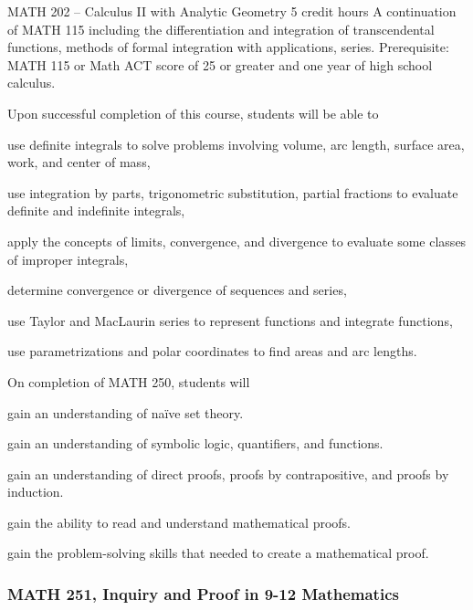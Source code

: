MATH 202 – Calculus II with Analytic Geometry 5 credit hours
A continuation of MATH 115 including the differentiation and integration of transcendental functions, methods of formal integration with applications, series.
Prerequisite: MATH 115 or Math ACT score of 25 or greater and one year of high school calculus.


 Upon successful completion of this course, students will be able to 
 \begin{alphalist}
    \item use definite integrals to solve problems involving volume, arc length, surface area, work, and center of mass, 
    \item use integration by parts, trigonometric substitution, partial fractions to evaluate definite and indefinite integrals,
    \item apply the concepts of limits, convergence, and divergence to evaluate some classes of improper integrals,
    \item determine convergence or divergence of sequences and series,
    \item use Taylor and MacLaurin series to represent functions and integrate functions,
    \item use parametrizations and polar coordinates to find areas and arc lengths.
 \end{alphalist}



On completion of MATH 250, students will 
\begin{alphalist}
    \item gain an understanding of naïve set theory. 
    \item gain an understanding of symbolic logic, quantifiers, and functions.
    \item gain an understanding of direct proofs, proofs by contrapositive, and proofs by induction.
    \item gain the ability to read and understand mathematical proofs.
    \item gain the problem-solving skills that needed to create a mathematical proof.
\end{alphalist}

\subsubsection*{MATH 251, Inquiry and Proof in 9-12 Mathematics}


